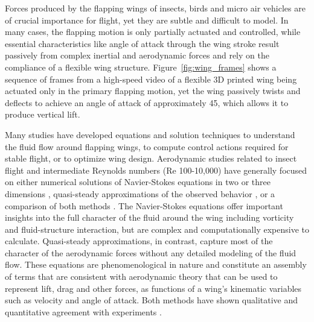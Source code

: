 \documentclass{article}
\begin{document}

Forces produced by the flapping wings of insects, birds and micro air vehicles
are of crucial importance for flight, yet they are subtle and difficult to
model. In many cases, the flapping motion is only partially actuated and
controlled, while essential characteristics like angle of attack through the
wing stroke result passively from complex inertial and aerodynamic forces and
rely on the compliance of a flexible wing structure.
Figure~\ref{fig:wing_frames} shows a sequence of frames from a high-speed video
of a flexible 3D printed wing being actuated only in the primary flapping
motion, yet the wing passively twists and deflects to achieve an angle of attack
of approximately 45\textdegree, which allows it to produce vertical lift.

Many studies have developed equations and solution techniques to
understand the fluid flow around flapping wings, to compute control actions
required for stable flight, or to optimize wing design. Aerodynamic studies
related to insect flight and intermediate Reynolds numbers (Re 100-10,000) have
generally focused on either numerical solutions of Navier-Stokes equations in
two or three dimensions \cite{wu2004unsteady,wang2000two}, quasi-steady
approximations of the observed behavior
\cite{sane2002aerodynamic,ellington1984aerodynamics}, or a comparison of both
methods \cite{pesavento2004falling}.  The Navier-Stokes equations offer
important insights into the full character of the fluid around the wing
including vorticity and fluid-structure interaction, but are complex and
computationally expensive to calculate.  Quasi-steady approximations, in
contrast, capture most of the character of the aerodynamic forces without any
detailed modeling of the fluid flow.  These equations are phenomenological in
nature and constitute an assembly of terms that are consistent with aerodynamic
theory that can be used to represent lift, drag and other forces, as functions
of a wing's kinematic variables such as velocity and angle of attack.  Both
methods have shown qualitative and quantitative agreement with experiments
\cite{wang2004unsteady}.

\end{document}
